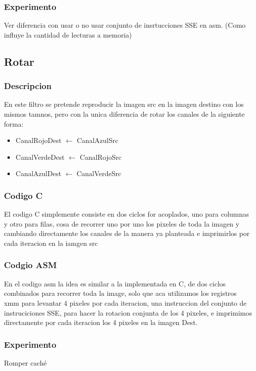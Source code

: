 \subsubsection{Experimento}
Ver diferencia con usar o no usar conjunto de insrtucciones SSE en asm. (Como influye la cantidad de lecturas a memoria)

\subsection{Rotar}
\subsubsection{Descripcion}
En este filtro se pretende reproducir la imagen src en la imagen destino con los mismos tamnos, pero con la unica diferencia de rotar los canales de la siguiente forma:
\begin{itemize}
\item {CanalRojoDest $\leftarrow$ CanalAzulSrc}
\item {CanalVerdeDest $\leftarrow$ CanalRojoSrc}
\item {CanalAzulDest $\leftarrow$ CanalVerdeSrc} 
\end{itemize}

\subsubsection{Codigo C}
El codigo C simplemente consiste en dos ciclos for acoplados, uno para columnas y otro para filas, cosa de recorrer uno por uno los pixeles de toda la imagen y cambiando directamente los canales de la manera ya planteada e imprimirlos por cada iteracion en la iamgen src

\subsubsection{Codgio ASM}
En el codigo asm la idea es similar a la implementada en C, de dos ciclos combinados para recorrer toda la image,  solo que aca utilizamos los registros xmm para levantar 4 pixeles por cada iteracion, una instruccion del conjunto de instruciciones SSE, para hacer la rotacion conjunta de los 4 pixeles, e imprimimos directamente por cada iteracion los 4 pixeles en la imagen Dest.

\subsubsection{Experimento}
Romper caché



